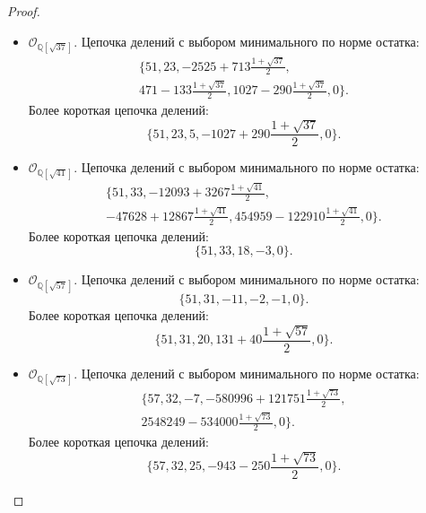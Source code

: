 \documentclass[_00_dissertation.tex]{subfiles}
\begin{document}
\begin{proof}
\begin{itemize}
        \item $\mathcal{O}_{\mathbb{Q}[\sqrt{37}]}$.
        Цепочка делений с выбором минимального по норме остатка:
        \begin{multline*}
            \{51, 23, -2525+713\frac{1+\sqrt{37}}{2},\\
            471-133\frac{1+\sqrt{37}}{2}, 1027-290\frac{1+\sqrt{37}}{2}, 0\}.
        \end{multline*}
        Более короткая цепочка делений:
        \begin{equation*}
            \{51, 23, 5, -1027+290\frac{1+\sqrt{37}}{2}, 0\}.
        \end{equation*}
    
        \item $\mathcal{O}_{\mathbb{Q}[\sqrt{41}]}$.
        Цепочка делений с выбором минимального по норме остатка:
        \begin{multline*}
            \{51, 33, -12093+3267\frac{1+\sqrt{41}}{2},\\
            -47628+12867\frac{1+\sqrt{41}}{2}, 454959-122910\frac{1+\sqrt{41}}{2}, 0\}.
        \end{multline*}
        Более короткая цепочка делений:
        \begin{equation*}
            \{51, 33, 18, -3, 0\}.
        \end{equation*}
    
        \item $\mathcal{O}_{\mathbb{Q}[\sqrt{57}]}$.
        Цепочка делений с выбором минимального по норме остатка:
        \begin{equation*}
            \{51, 31, -11, -2, -1, 0\}.
        \end{equation*}
        Более короткая цепочка делений:
        \begin{equation*}
            \{51, 31, 20, 131+40\frac{1+\sqrt{57}}{2}, 0\}.
        \end{equation*}
    
        \item $\mathcal{O}_{\mathbb{Q}[\sqrt{73}]}$.
        Цепочка делений с выбором минимального по норме остатка:
        \begin{multline*}
            \{57, 32, -7, -580996+121751\frac{1+\sqrt{73}}{2},\\
            2548249-534000\frac{1+\sqrt{73}}{2}, 0\}.
        \end{multline*}
        Более короткая цепочка делений:
        \begin{equation*}
            \{57, 32, 25, -943-250\frac{1+\sqrt{73}}{2}, 0\}.
        \end{equation*}
    \end{itemize}
    
\end{proof}
\end{document}
